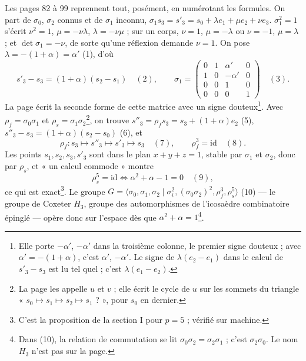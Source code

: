 \documentclass[11pt,a4paper]{article}
\begin{document}
Les pages 82 à 99 reprennent tout, posément, en numérotant les formules. On
part de $\sigma_0$, $\sigma_2$ connus et de $\sigma_1$ inconnu, $\sigma_1 s_3 =
s'_3 = s_0 + \lambda e_1 + \mu e_2 + \nu e_3$. $\sigma_1^2 = 1$ s'écrit $\nu^2 =
1$, $\mu = -\nu\lambda$, $\lambda = -\nu\mu$ ; sur un corps, $\nu = 1$, $\mu =
-\lambda$ ou $\nu = -1$, $\mu = \lambda$ ; et $\det\sigma_1 = -\nu$, de sorte
qu'une réflexion demande $\nu = 1$. On pose $\lambda = -(1 + \alpha) = \alpha'$
(1), d'où
\[
s'_3 - s_3 = (1 + \alpha)(s_2 - s_1) \quad (2), \qquad
\sigma_1 = \begin{pmatrix} 0 & 1 & \alpha' & 0 \\ 1 & 0 & -\alpha' & 0 \\ 0 & 0 & 1
& 0 \\ 0 & 0 & 0 & 1 \end{pmatrix} \quad (3) .
\]
La page écrit la seconde forme de cette matrice avec un signe
douteux\footnote{Elle porte $-\alpha'$, $-\alpha'$ dans la troisième colonne,
le premier signe douteux ; avec $\alpha' = -(1 + \alpha)$, c'est $\alpha'$,
$-\alpha'$. Le signe de $\lambda(e_2 - e_1)$ dans le calcul de $s'_3 - s_3$ est
lu tel quel ; c'est $\lambda(e_1 - e_2)$.}.
Avec $\rho_f = \sigma_0\sigma_1$ et $\rho_s = \sigma_1\sigma_2$\footnote{La page
les appelle $u$ et $v$ ; elle écrit le cycle de $u$ sur les sommets du triangle
« $s_0 \mapsto s_1 \mapsto s_2 \mapsto s_1$ ? », pour $s_0$ en dernier.}, on
trouve $s''_3 = \rho_f s_3 = s_3 + (1 + \alpha)e_2$ (5), $s''_3 - s_3 = (1 +
\alpha)(s_2 - s_0)$ (6), et
\[
\rho_f : s_3 \mapsto s''_3 \mapsto s'_3 \mapsto s_3 \quad (7), \qquad \rho_f^3 =
\mathrm{id} \quad (8) .
\]
Les points $s_1, s_2, s_3, s'_3$ sont dans le plan $x + y + z = 1$, stable par
$\sigma_1$ et $\sigma_2$, donc par $\rho_s$, et « un calcul commode » montre
\[
\rho_s^5 = \mathrm{id} \iff \alpha^2 + \alpha - 1 = 0 \quad (9) ,
\]
ce qui est exact\footnote{C'est la proposition de la section I pour $p = 5$ ;
vérifié sur machine.}.
Le groupe $G = \langle \sigma_0, \sigma_1, \sigma_2 \mid \sigma_i^2,
(\sigma_0\sigma_2)^2, \rho_f^3, \rho_s^5 \rangle$ (10) --- le groupe de Coxeter
$H_3$, groupe des automorphismes de l'icosaèdre combinatoire épinglé --- opère
donc sur l'espace dès que $\alpha^2 + \alpha = 1$\footnote{Dans (10), la
relation de commutation se lit $\sigma_0\sigma_2 = \sigma_2\sigma_1$ ; c'est
$\sigma_2\sigma_0$. Le nom $H_3$ n'est pas sur la page.}.
\end{document}

